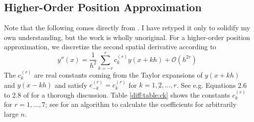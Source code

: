 \documentclass[11pt, a4paper]{article}
\begin{document}
\subsection{Higher-Order Position Approximation} \label{diff:ss:CN-position}
Note that the following comes directly from \cite{vandijk}. I have retyped it only to solidify my own understanding, but the work is wholly unoriginal. For a higher-order position approximation, we discretize the second spatial derivative according to
\begin{equation*}
	y''(x) = \frac{1}{h^{2}}\sum_{k=-r}^{r}c_{k}^{(r)}y(x + kh) + \mathcal{O}(h^{2r})
\end{equation*}
The $ c_{k}^{(r)} $ are real constants coming from the Taylor expansions of $ y(x + kh) $ and $ y(x - kh) $ and satisfy $ c_{-k}^{(r)} = c_{k}^{(r)} $ for $ k = 1, 2, \ldots, r $. See e.g. Equations 2.6 to 2.8 of \cite{vandijk} for a thorough discussion. Table \ref{diff:table:ck} shows the constants $ c_{k}^{(r)} $ for $ r = 1, \ldots, 7 $; see \cite{fornberg} for an algorithm to calculate the coefficients for arbitrarily large $ n $.
\end{document}

